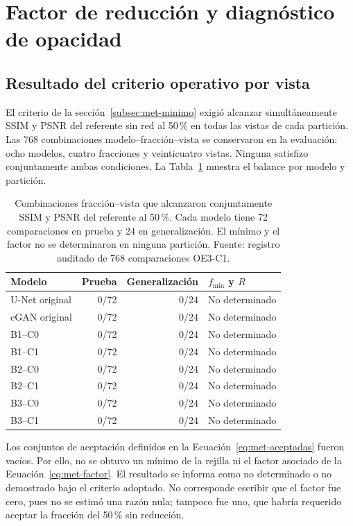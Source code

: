 \section{Factor de reducción y diagnóstico de opacidad}\label{sec:res-factor}
\subsection{Resultado del criterio operativo por vista}
El criterio de la sección~\ref{subsec:met-minimo} exigió alcanzar simultáneamente SSIM y PSNR del referente sin red al 50\,\% en todas las vistas de cada partición. Las 768 combinaciones modelo--fracción--vista se conservaron en la evaluación: ocho modelos, cuatro fracciones y veinticuatro vistas. Ninguna satisfizo conjuntamente ambas condiciones. La Tabla~\ref{tab:res-benchmark} muestra el balance por modelo y partición.
\begin{table}[htbp]\centering\small
\caption[Balance del criterio conjunto por vista]{Combinaciones fracción--vista que alcanzaron conjuntamente SSIM y PSNR del referente al 50\,\%. Cada modelo tiene 72 comparaciones en prueba y 24 en generalización. El mínimo y el factor no se determinaron en ninguna partición. Fuente: registro auditado de 768 comparaciones OE3-C1.}\label{tab:res-benchmark}
\begin{tabular}{@{}lrrl@{}}\toprule
Modelo & Prueba & Generalización & $f_{\min}$ y $R$\\\midrule
U-Net original & 0/72 & 0/24 & No determinado\\
cGAN original & 0/72 & 0/24 & No determinado\\
B1--C0 & 0/72 & 0/24 & No determinado\\
B1--C1 & 0/72 & 0/24 & No determinado\\
B2--C0 & 0/72 & 0/24 & No determinado\\
B2--C1 & 0/72 & 0/24 & No determinado\\
B3--C0 & 0/72 & 0/24 & No determinado\\
B3--C1 & 0/72 & 0/24 & No determinado\\
\bottomrule\end{tabular}\end{table}

Los conjuntos de aceptación definidos en la Ecuación~\eqref{eq:met-aceptadas} fueron vacíos. Por ello, no se obtuvo un mínimo de la rejilla ni el factor asociado de la Ecuación~\eqref{eq:met-factor}. El resultado se informa como no determinado o no demostrado bajo el criterio adoptado. No corresponde escribir que el factor fue cero, pues no se estimó una razón nula; tampoco fue uno, que habría requerido aceptar la fracción del 50\,\% sin reducción.

